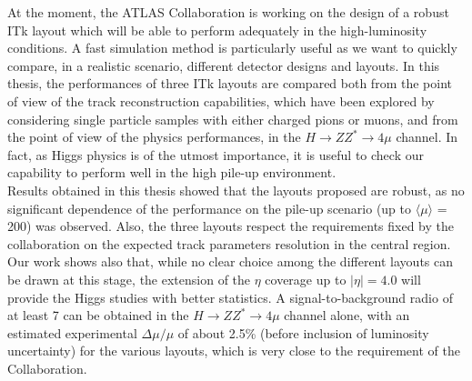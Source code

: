 \documentclass[paper=a4, fontsize=11pt]{scrartcl}	%
\numberwithin{equation}{section}		%
\numberwithin{figure}{section}			%
\numberwithin{table}{section}				%
\begin{document}
At the moment, the ATLAS Collaboration is working on the design of a robust ITk layout
 which will be able to perform adequately in the high-luminosity conditions. A fast simulation method is particularly useful as we want to quickly compare, in a realistic scenario, different detector designs and layouts. In this thesis, the performances of three ITk layouts are compared both from the point of view of the track reconstruction capabilities, which have been explored by considering single particle samples with either charged pions or muons, and 
from the point of view of the physics performances, in the $H \rightarrow ZZ^{*} \rightarrow 4\mu$ channel. In fact, 
 as Higgs physics is of the utmost importance, it is useful to check our capability to perform
 well in the high pile-up environment. \\
 
Results obtained in this thesis showed that the layouts proposed 
are robust, as no significant dependence of the performance on the pile-up scenario (up to $\langle\mu\rangle$ = 200) was observed. Also, the three layouts respect the requirements fixed by the collaboration on the expected track parameters resolution in the central
region. Our work shows also that, while no clear choice among the different layouts can be drawn at this stage, the extension of the $\eta$ coverage up to $|\eta| = 4.0$ will provide the Higgs studies with better statistics. A signal-to-background radio of at least 7 can be obtained in the $H \rightarrow ZZ^{*} \rightarrow 4\mu$ channel alone, with an estimated experimental $\Delta\mu/\mu$ of about 2.5\%  (before inclusion of luminosity uncertainty) for the various layouts, which is very close to the requirement of the Collaboration. 
\end{document}
